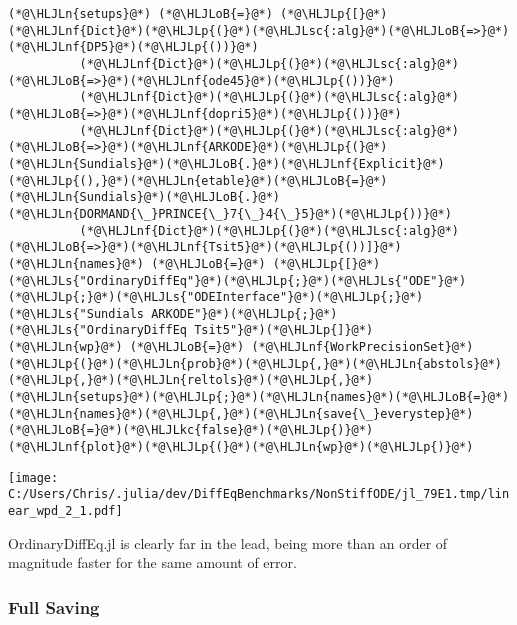 \documentclass[12pt,a4paper]{article}
\newcommand{\HLJLkc}[1]{\textcolor[RGB]{59,151,46}{\textit{#1}}}
\newcommand{\HLJLn}[1]{#1}
\newcommand{\HLJLnf}[1]{\textcolor[RGB]{66,102,213}{#1}}
\newcommand{\HLJLs}[1]{\textcolor[RGB]{201,61,57}{#1}}
\newcommand{\HLJLsc}[1]{\textcolor[RGB]{201,61,57}{#1}}
\newcommand{\HLJLoB}[1]{\textcolor[RGB]{102,102,102}{\textbf{#1}}}
\newcommand{\HLJLp}[1]{#1}
\begin{document}
\begin{lstlisting}
(*@\HLJLn{setups}@*) (*@\HLJLoB{=}@*) (*@\HLJLp{[}@*)(*@\HLJLnf{Dict}@*)(*@\HLJLp{(}@*)(*@\HLJLsc{:alg}@*)(*@\HLJLoB{=>}@*)(*@\HLJLnf{DP5}@*)(*@\HLJLp{())}@*)
          (*@\HLJLnf{Dict}@*)(*@\HLJLp{(}@*)(*@\HLJLsc{:alg}@*)(*@\HLJLoB{=>}@*)(*@\HLJLnf{ode45}@*)(*@\HLJLp{())}@*)
          (*@\HLJLnf{Dict}@*)(*@\HLJLp{(}@*)(*@\HLJLsc{:alg}@*)(*@\HLJLoB{=>}@*)(*@\HLJLnf{dopri5}@*)(*@\HLJLp{())}@*)
          (*@\HLJLnf{Dict}@*)(*@\HLJLp{(}@*)(*@\HLJLsc{:alg}@*)(*@\HLJLoB{=>}@*)(*@\HLJLnf{ARKODE}@*)(*@\HLJLp{(}@*)(*@\HLJLn{Sundials}@*)(*@\HLJLoB{.}@*)(*@\HLJLnf{Explicit}@*)(*@\HLJLp{(),}@*)(*@\HLJLn{etable}@*)(*@\HLJLoB{=}@*)(*@\HLJLn{Sundials}@*)(*@\HLJLoB{.}@*)(*@\HLJLn{DORMAND{\_}PRINCE{\_}7{\_}4{\_}5}@*)(*@\HLJLp{))}@*)
          (*@\HLJLnf{Dict}@*)(*@\HLJLp{(}@*)(*@\HLJLsc{:alg}@*)(*@\HLJLoB{=>}@*)(*@\HLJLnf{Tsit5}@*)(*@\HLJLp{())]}@*)
(*@\HLJLn{names}@*) (*@\HLJLoB{=}@*) (*@\HLJLp{[}@*)(*@\HLJLs{"OrdinaryDiffEq"}@*)(*@\HLJLp{;}@*)(*@\HLJLs{"ODE"}@*)(*@\HLJLp{;}@*)(*@\HLJLs{"ODEInterface"}@*)(*@\HLJLp{;}@*)(*@\HLJLs{"Sundials ARKODE"}@*)(*@\HLJLp{;}@*)(*@\HLJLs{"OrdinaryDiffEq Tsit5"}@*)(*@\HLJLp{]}@*)
(*@\HLJLn{wp}@*) (*@\HLJLoB{=}@*) (*@\HLJLnf{WorkPrecisionSet}@*)(*@\HLJLp{(}@*)(*@\HLJLn{prob}@*)(*@\HLJLp{,}@*)(*@\HLJLn{abstols}@*)(*@\HLJLp{,}@*)(*@\HLJLn{reltols}@*)(*@\HLJLp{,}@*)(*@\HLJLn{setups}@*)(*@\HLJLp{;}@*)(*@\HLJLn{names}@*)(*@\HLJLoB{=}@*)(*@\HLJLn{names}@*)(*@\HLJLp{,}@*)(*@\HLJLn{save{\_}everystep}@*)(*@\HLJLoB{=}@*)(*@\HLJLkc{false}@*)(*@\HLJLp{)}@*)
(*@\HLJLnf{plot}@*)(*@\HLJLp{(}@*)(*@\HLJLn{wp}@*)(*@\HLJLp{)}@*)
\end{lstlisting}

\texttt{[image: C:/Users/Chris/.julia/dev/DiffEqBenchmarks/NonStiffODE/jl\_79E1.tmp/linear\_wpd\_2\_1.pdf]}

OrdinaryDiffEq.jl is clearly far in the lead, being more than an order of magnitude faster for the same amount of error.

\subsubsection{Full Saving}
\end{document}
